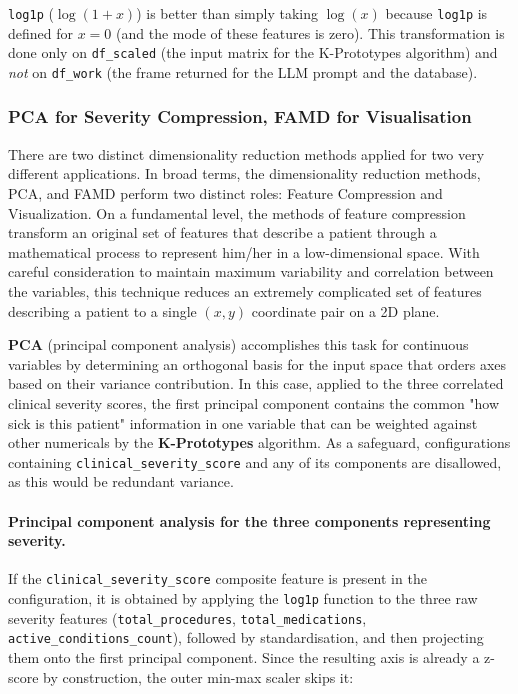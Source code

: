 \noindent \texttt{log1p} (\(\log(1+x)\)) is better than simply taking \(\log(x)\) because \texttt{log1p} is defined for \(x=0\) (and the mode of these features is zero). This transformation is done only on \texttt{df\_scaled} (the input matrix for the K-Prototypes algorithm) and \emph{not} on \texttt{df\_work} (the frame returned for the LLM prompt and the database).

\subsubsection*{PCA for Severity Compression, FAMD for Visualisation}

There are two distinct dimensionality reduction methods applied for two very different applications. In broad terms, the dimensionality reduction methods, PCA, and FAMD perform two distinct roles: Feature Compression and Visualization. On a fundamental level, the methods of feature compression transform an original set of features that describe a patient through a mathematical process to represent him/her in a low-dimensional space. With careful consideration to maintain maximum variability and correlation between the variables, this technique reduces an extremely complicated set of features describing a patient to a single $(x,y)$ coordinate pair on a 2D plane.

\vspace{0.5em}
\textbf{PCA} (principal component analysis) accomplishes this task for continuous variables by determining an orthogonal basis for the input space that orders axes based on their variance contribution. In this case, applied to the three correlated clinical severity scores, the first principal component contains the common "how sick is this patient" information in one variable that can be weighted against other numericals by the \textbf{K-Prototypes} algorithm. As a safeguard, configurations containing \texttt{clinical\_severity\_score} and any of its components are disallowed, as this would be redundant variance.

\paragraph{Principal component analysis for the three components representing severity.} If the \texttt{clinical\_severity\_score} composite feature is present in the configuration, it is obtained by applying the \texttt{log1p} function to the three raw severity features (\texttt{total\_procedures}, \texttt{total\_medications}, \texttt{active\_conditions\_count}), followed by standardisation, and then projecting them onto the first principal component. Since the resulting axis is already a z-score by construction, the outer min-max scaler skips it:


